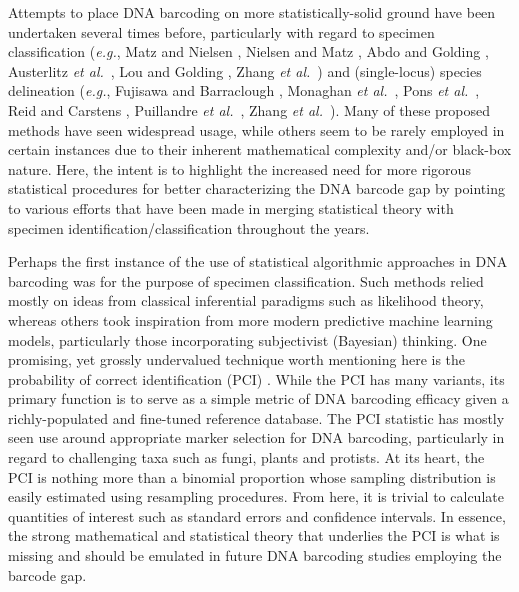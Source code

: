 Attempts to place DNA barcoding on more statistically-solid ground have been \\ undertaken several times before, particularly with regard to specimen classification (\textit{e.g.}, Matz and Nielsen \cite{matz2005likelihood}, Nielsen and Matz \cite{nielsen2006statistical}, Abdo and Golding \cite{abdo2007step}, Austerlitz \textit{et al.}~\cite{austerlitz2009dna}, Lou and Golding \cite{lou2010assigning}, Zhang \textit{et al.}~\cite{zhang2012fuzzy}) and (single-locus) species delineation (\textit{e.g.}, Fujisawa and Barraclough \cite{fujisawa2013delimiting}, Monaghan \textit{et al.}~\cite{monaghan2009accelerated}, Pons \textit{et al.}~\cite{pons2006sequence}, Reid and Carstens \cite{reid2012phylogenetic}, Puillandre \textit{et al.}~\cite{puillandre2011abgd}, Zhang \textit{et al.}~\cite{zhang2013general}). Many of these proposed methods have seen widespread usage, while others seem to be rarely employed in certain instances due to their inherent mathematical complexity and/or black-box nature. Here, the intent is to highlight the increased need for more rigorous statistical procedures for better characterizing the DNA barcode gap by pointing to various efforts that have been made in merging statistical theory with specimen identification/classification throughout the years.

 

Perhaps the first instance of the use of statistical algorithmic approaches in DNA \\ barcoding was for the purpose of specimen classification. Such methods relied mostly on ideas from classical inferential paradigms such as likelihood theory, whereas others took inspiration from more modern predictive machine learning models, particularly those incorporating subjectivist (Bayesian) thinking. One promising, yet grossly undervalued technique worth mentioning here is the probability of correct identification (PCI) \cite{martin2020figures, spouge2012practical}. While the PCI has many variants, its primary function is to serve as a simple metric of DNA barcoding efficacy given a richly-populated and fine-tuned reference database. The PCI statistic has mostly seen use around appropriate marker selection for DNA barcoding, particularly in regard to challenging taxa such as fungi, plants and protists. At its heart, the PCI is nothing more than a binomial proportion whose sampling distribution is easily estimated using resampling procedures. From here, it is trivial to calculate quantities of interest such as standard errors and confidence intervals. In essence, the strong mathematical and statistical theory that underlies the PCI is what is missing and should be emulated in future DNA barcoding studies employing the barcode gap.

